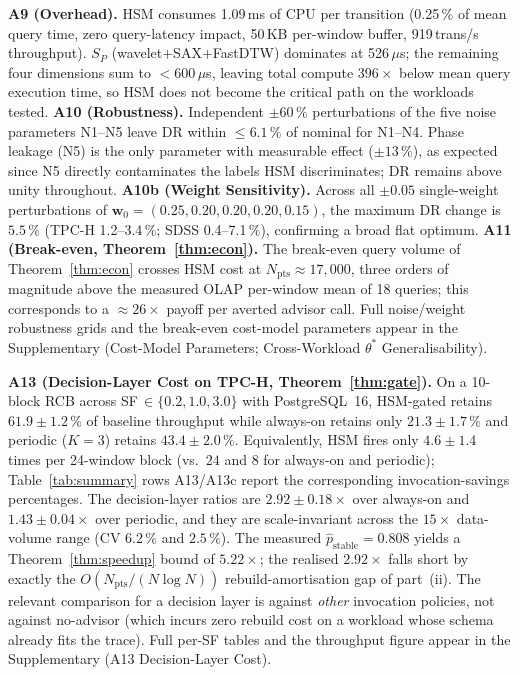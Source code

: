 \documentclass[10pt,journal,compsoc]{IEEEtran}
\newcommand{\SPER}{S_{P}}
\newcommand{\Npts}{N_{\mathrm{pts}}}
\begin{document}
\textbf{A9 (Overhead).} HSM consumes 1.09\,ms of CPU per transition
(0.25\,\% of mean query time, zero query-latency impact, 50\,KB
per-window buffer, 919\,trans/s throughput). $\SPER$ (wavelet$+$SAX$+$FastDTW)
dominates at 526\,$\mu$s; the remaining four dimensions sum to
$<\!600\,\mu$s, leaving total compute $396\times$ below mean query
execution time, so HSM does not become the critical path on the
workloads tested.
\textbf{A10 (Robustness).} Independent $\pm60\,\%$ perturbations of
the five noise parameters N1--N5 leave DR within $\leq\!6.1\,\%$ of
nominal for N1--N4. Phase leakage (N5) is the only parameter with
measurable effect ($\pm 13\,\%$), as expected since N5 directly
contaminates the labels HSM discriminates; DR remains above unity
throughout. \textbf{A10b (Weight Sensitivity).} Across all
$\pm 0.05$ single-weight perturbations of
$\mathbf{w}_0\!=\!(0.25,0.20,0.20,0.20,0.15)$, the maximum DR change is
$5.5\,\%$ (TPC-H 1.2--3.4\,\%; SDSS 0.4--7.1\,\%), confirming a broad
flat optimum.
\textbf{A11 (Break-even, Theorem~\ref{thm:econ}).} The break-even
query volume of Theorem~\ref{thm:econ} crosses HSM cost at
$\Npts\!\approx\!17{,}000$, three orders of magnitude above the
measured OLAP per-window mean of 18 queries; this corresponds to a
$\approx 26\times$ payoff per averted advisor call. Full noise/weight
robustness grids and the break-even cost-model parameters appear in
the Supplementary (Cost-Model Parameters; Cross-Workload
$\theta^{*}$ Generalisability).

\textbf{A13 (Decision-Layer Cost on TPC-H, Theorem~\ref{thm:gate}).}
On a 10-block RCB across SF\,$\in\!\{0.2,1.0,3.0\}$ with PostgreSQL~16,
HSM-gated retains $61.9\!\pm\!1.2\,\%$ of baseline throughput while
always-on retains only $21.3\!\pm\!1.7\,\%$ and periodic ($K\!=\!3$)
retains $43.4\!\pm\!2.0\,\%$. Equivalently, HSM fires only
$4.6\!\pm\!1.4$ times per 24-window block (vs.\ $24$ and $8$ for
always-on and periodic); Table~\ref{tab:summary} rows A13/A13c
report the corresponding invocation-savings percentages. The decision-layer ratios are
$2.92\!\pm\!0.18\times$ over always-on and $1.43\!\pm\!0.04\times$
over periodic, and they are scale-invariant across the $15\times$
data-volume range (CV $6.2\,\%$ and $2.5\,\%$). The measured
$\hat{p}_{\mathrm{stable}}\!=\!0.808$ yields a
Theorem~\ref{thm:speedup} bound of $5.22\times$; the realised
$2.92\times$ falls short by exactly the $O(\Npts/(N\log N))$
rebuild-amortisation gap of part~(ii). The relevant comparison for a
decision layer is against \emph{other} invocation policies, not against
no-advisor (which incurs zero rebuild cost on a workload whose schema
already fits the trace). Full per-SF tables and the throughput figure
appear in the Supplementary (A13 Decision-Layer Cost).
\end{document}
